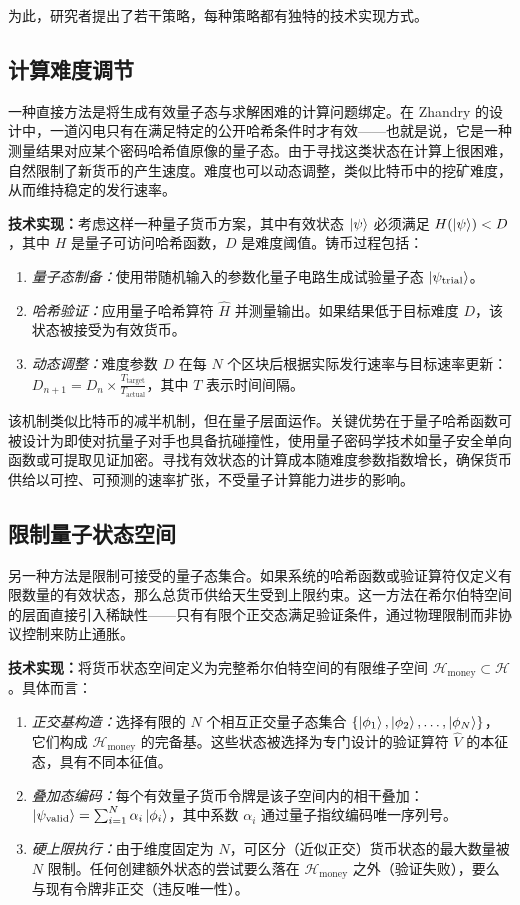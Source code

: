 \documentclass[a4paper,10.5pt,twoside]{article}
\begin{document}
为此，研究者提出了若干策略，每种策略都有独特的技术实现方式。

\subsection{计算难度调节}\label{s:3.1}
一种直接方法是将生成有效量子态与求解困难的计算问题绑定。在 Zhandry 的设计中，\autocite{Zhandry_2021}一道闪电只有在满足特定的公开哈希条件时才有效——也就是说，它是一种测量结果对应某个密码哈希值原像的量子态。由于寻找这类状态在计算上很困难，自然限制了新货币的产生速度。难度也可以动态调整，类似比特币中的挖矿难度，从而维持稳定的发行速率。

\textbf{技术实现：}考虑这样一种量子货币方案，其中有效状态 $\ket{\psi}$ 必须满足 $H(\ket{\psi}) < D$，其中 $H$ 是量子可访问哈希函数，$D$ 是难度阈值。铸币过程包括：
\begin{enumerate}
\item \textit{量子态制备：}使用带随机输入的参数化量子电路生成试验量子态 $\ket{\psi_{\text{trial}}}$。
\item \textit{哈希验证：}应用量子哈希算符 $\hat{H}$ 并测量输出。如果结果低于目标难度 $D$，该状态被接受为有效货币。
\item \textit{动态调整：}难度参数 $D$ 在每 $N$ 个区块后根据实际发行速率与目标速率更新：$D_{n+1} = D_n \times \frac{T_{\text{target}}}{T_{\text{actual}}}$，其中 $T$ 表示时间间隔。
\end{enumerate}

该机制类似比特币的减半机制，但在量子层面运作。关键优势在于量子哈希函数可被设计为即使对抗量子对手也具备抗碰撞性，使用量子密码学技术如量子安全单向函数或可提取见证加密。寻找有效状态的计算成本随难度参数指数增长，确保货币供给以可控、可预测的速率扩张，不受量子计算能力进步的影响。

\subsection{限制量子状态空间}\label{s:3.2}
另一种方法是限制可接受的量子态集合。如果系统的哈希函数或验证算符仅定义有限数量的有效状态，那么总货币供给天生受到上限约束。这一方法在希尔伯特空间的层面直接引入稀缺性——只有有限个正交态满足验证条件，通过物理限制而非协议控制来防止通胀。

\textbf{技术实现：}将货币状态空间定义为完整希尔伯特空间的有限维子空间 $\mathcal{H}_{\text{money}} \subset \mathcal{H}$。具体而言：
\begin{enumerate}
\item \textit{正交基构造：}选择有限的 $N$ 个相互正交量子态集合 $\{\ket{\phi_1}, \ket{\phi_2}, \ldots, \ket{\phi_N}\}$，它们构成 $\mathcal{H}_{\text{money}}$ 的完备基。这些状态被选择为专门设计的验证算符 $\hat{V}$ 的本征态，具有不同本征值。
\item \textit{叠加态编码：}每个有效量子货币令牌是该子空间内的相干叠加：$\ket{\psi_{\text{valid}}} = \sum_{i=1}^{N} \alpha_i \ket{\phi_i}$，其中系数 $\alpha_i$ 通过量子指纹编码唯一序列号。
\item \textit{硬上限执行：}由于维度固定为 $N$，可区分（近似正交）货币状态的最大数量被 $N$ 限制。任何创建额外状态的尝试要么落在 $\mathcal{H}_{\text{money}}$ 之外（验证失败），要么与现有令牌非正交（违反唯一性）。
\end{enumerate}
\end{document}
